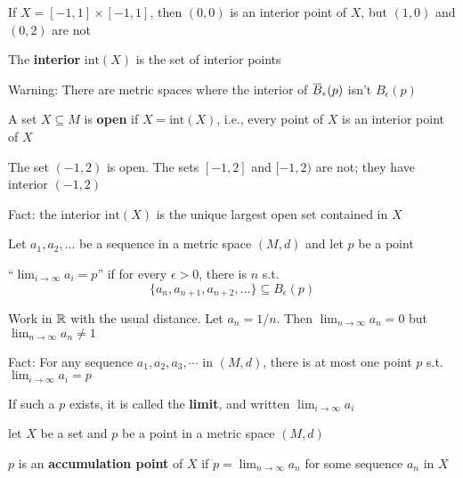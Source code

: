 \documentclass[11pt]{article}
\def \tint {\text{int}}
\begin{document}
\begin{examplle}[]
If \(X=[-1,1]\times[-1,1]\), then \((0,0)\) is an interior point of \(X\), but \((1,0)\)
and \((0,2)\) are not
\end{examplle}

\begin{definition}[]
The \textbf{interior} \(\tint(X)\) is the set of interior points
\end{definition}

Warning: There are metric spaces where the interior of \(\barB_\epsilon(p)\) isn't \(B_\epsilon(p)\)

\begin{definition}[]
A set \(X\subseteq M\) is \textbf{open} if \(X=\tint(X)\), i.e., every point of \(X\) is an interior point of \(X\)
\end{definition}

\begin{examplle}[in \(\R\)]
The set \((-1,2)\) is open. The sets \([-1,2]\) and \([-1,2)\) are not; they have interior \((-1,2)\)
\end{examplle}

Fact: the interior \(\tint(X)\) is the unique largest open set contained in \(X\)

Let \(a_1,a_2,\dots\) be a sequence in a metric space \((M,d)\) and let \(p\) be a point
\begin{definition}[]
``\(\lim_{i\to\infty}a_i=p\)'' if for every \(\epsilon>0\), there is \(n\) s.t.
\begin{equation*}
\{a_n,a_{n+1},a_{n+2},\dots\}\subseteq B_\epsilon(p)
\end{equation*}
\end{definition}

\begin{examplle}[]
Work in \(\R\) with the usual distance. Let \(a_n=1/n\). Then \(\lim_{n\to\infty}a_n=0\)
but \(\lim_{n\to\infty}a_n\neq 1\)
\end{examplle}

Fact: For any sequence \(a_1,a_2,a_3,\cdots\) in \((M,d)\), there is at most one point \(p\)
s.t. \(\lim_{i\to\infty}a_i=p\)

If such a \(p\) exists, it is called the \textbf{limit}, and written \(\lim_{i\to\infty}a_i\)

let \(X\) be a set and \(p\) be a point in a metric space \((M,d)\)

\begin{definition}[]
\(p\) is an \textbf{accumulation point} of \(X\) if \(p=\lim_{n\to\infty}a_n\) for some sequence \(a_n\) in \(X\)
\end{definition}
\end{document}
